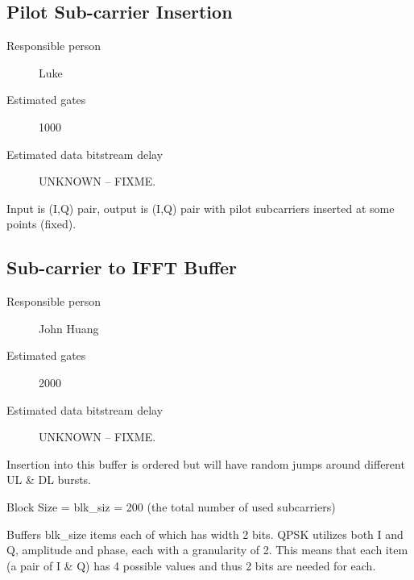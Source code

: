 \documentclass[dvips,10pt,twocolumn]{article}
\begin{document}
	
\subsection{Pilot Sub-carrier Insertion}
\label{sec:pilot}
\begin{description}
	\item[Responsible person] Luke
	\item[Estimated gates] 1000
	\item[Estimated data bitstream delay] UNKNOWN -- FIXME.
\end{description}

Input is (I,Q) pair, output is (I,Q) pair with pilot subcarriers
inserted at some points (fixed).


\subsection{Sub-carrier to IFFT Buffer}
\label{sec:ifft-buffer}
\begin{description}
	\item[Responsible person] John Huang
	\item[Estimated gates] 2000
	\item[Estimated data bitstream delay] UNKNOWN -- FIXME.
\end{description}
Insertion into this buffer is ordered but will have random
jumps around different UL \& DL bursts.

Block Size = blk\_siz = 200 (the total number of used
subcarriers)

Buffers blk\_size items each of which has width 2 bits.
QPSK utilizes both I and Q, amplitude and phase, each with
a granularity of 2. This means that each item (a pair of I
\& Q) has 4 possible values and thus 2 bits are needed for
each.
\end{document}
